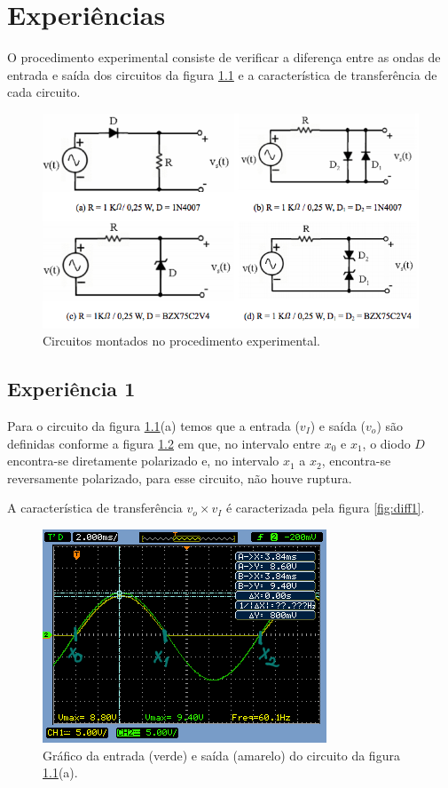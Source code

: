 \documentclass{abntex2}
\begin{document}
\imprimircapa
\imprimirfolhaderosto

\tableofcontents
\listoffigures
\clearpage

\chapter{Experiências}

O procedimento experimental consiste de verificar a diferença entre as ondas de entrada e saída dos circuitos da figura \ref{fig:circuitos} e a característica de transferência de cada circuito.

\begin{figure}[h]
  \centering
  \includegraphics[scale = 0.7]{circuitos.png}
  \caption{Circuitos montados no procedimento experimental.}
  \label{fig:circuitos}
\end{figure}

\section{Experiência 1}

Para o circuito da figura \ref{fig:circuitos}(a) temos que a entrada ($v_I$) e saída ($v_o$) são definidas conforme a figura \ref{fig:io1} em que, no intervalo entre $x_0$ e $x_1$, o diodo $D$ encontra-se diretamente polarizado e, no intervalo $x_1$ a $x_2$, encontra-se reversamente polarizado, para esse circuito, não houve ruptura.

A característica de transferência $v_o \times v_I$ é caracterizada pela figura \ref{fig:diff1}.

\begin{figure}[h]
  \centering
  \includegraphics[scale = 0.7]{circuito-1a-esboco2.png}
  \caption{Gráfico da entrada (verde) e saída (amarelo) do circuito da figura \ref{fig:circuitos}(a).}
  \label{fig:io1}
\end{figure}
\end{document}
